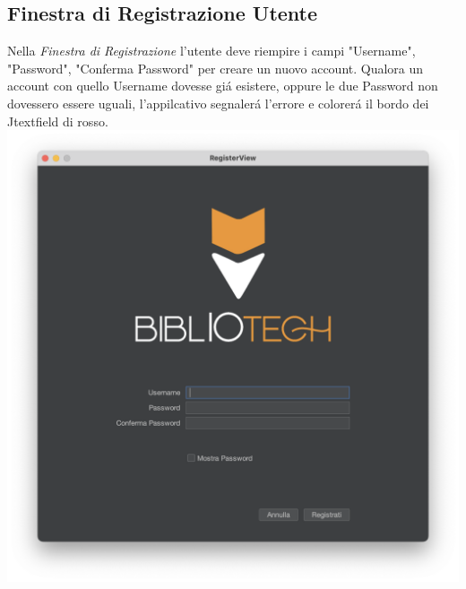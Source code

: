  \subsection{Finestra di Registrazione Utente}
 Nella \textit{Finestra di Registrazione} l'utente deve riempire i campi "Username", "Password", "Conferma Password" per creare un
 nuovo account. Qualora un account con quello Username dovesse gi\'a esistere, oppure le due Password non dovessero
 essere uguali, l'appilcativo segnaler\'a l'errore e colorer\'a il bordo dei Jtextfield di rosso.
 \\
 \includegraphics[scale=0.25, center]{Immagini/Schermate/Login_Register/RegisterPage.png}

